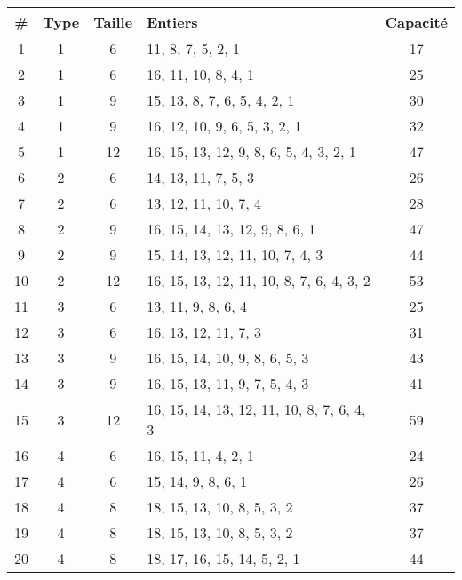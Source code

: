 \begin{tabular}{ccclc}
\toprule
\# & Type & Taille & Entiers & Capacité \\
\midrule
1 & 1 & 6 & 11, 8, 7, 5, 2, 1 & 17 \\
2 & 1 & 6 & 16, 11, 10, 8, 4, 1 & 25 \\
3 & 1 & 9 & 15, 13, 8, 7, 6, 5, 4, 2, 1 & 30 \\
4 & 1 & 9 & 16, 12, 10, 9, 6, 5, 3, 2, 1 & 32 \\
5 & 1 & 12 & 16, 15, 13, 12, 9, 8, 6, 5, 4, 3, 2, 1 & 47 \\
6 & 2 & 6 & 14, 13, 11, 7, 5, 3 & 26 \\
7 & 2 & 6 & 13, 12, 11, 10, 7, 4 & 28 \\
8 & 2 & 9 & 16, 15, 14, 13, 12, 9, 8, 6, 1 & 47 \\
9 & 2 & 9 & 15, 14, 13, 12, 11, 10, 7, 4, 3 & 44 \\
10 & 2 & 12 & 16, 15, 13, 12, 11, 10, 8, 7, 6, 4, 3, 2 & 53 \\
11 & 3 & 6 & 13, 11, 9, 8, 6, 4 & 25 \\
12 & 3 & 6 & 16, 13, 12, 11, 7, 3 & 31 \\
13 & 3 & 9 & 16, 15, 14, 10, 9, 8, 6, 5, 3 & 43 \\
14 & 3 & 9 & 16, 15, 13, 11, 9, 7, 5, 4, 3 & 41 \\
15 & 3 & 12 & 16, 15, 14, 13, 12, 11, 10, 8, 7, 6, 4, 3 & 59 \\
16 & 4 & 6 & 16, 15, 11, 4, 2, 1 & 24 \\
17 & 4 & 6 & 15, 14, 9, 8, 6, 1 & 26 \\
18 & 4 & 8 & 18, 15, 13, 10, 8, 5, 3, 2 & 37 \\
19 & 4 & 8 & 18, 15, 13, 10, 8, 5, 3, 2 & 37 \\
20 & 4 & 8 & 18, 17, 16, 15, 14, 5, 2, 1 & 44 \\
\bottomrule
\end{tabular}
